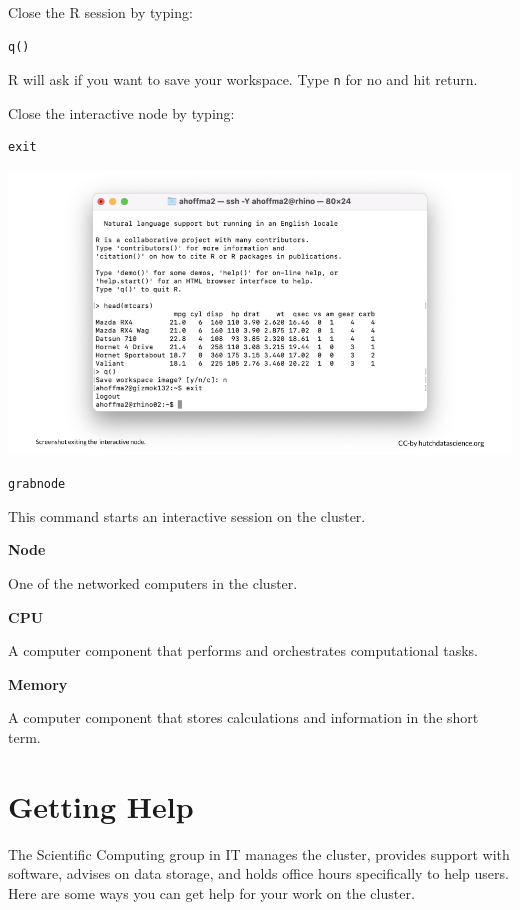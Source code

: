 \documentclass[
]{book}
\begin{document}
Close the R session by typing:

\begin{verbatim}
q()
\end{verbatim}

R will ask if you want to save your workspace. Type \texttt{n} for no and hit return.

Close the interactive node by typing:

\begin{verbatim}
exit
\end{verbatim}

\includegraphics[width=1\linewidth]{resources/images/07-interactive_files/figure-latex//1BQxrVYdKZTbpCaF-i_q9w7s9x034lEXpQZDU-Sl09cs_gff2211b72f_1_82}

\texttt{grabnode}

This command starts an interactive session on the cluster.

\textbf{Node}

One of the networked computers in the cluster.

\textbf{CPU}

A computer component that performs and orchestrates computational tasks.

\textbf{Memory}

A computer component that stores calculations and information in the short term.

\hypertarget{help}{%
\chapter{Getting Help}\label{help}}

The Scientific Computing group in IT manages the cluster, provides support with software, advises on data storage, and holds office hours specifically to help users. Here are some ways you can get help for your work on the cluster.
\end{document}
